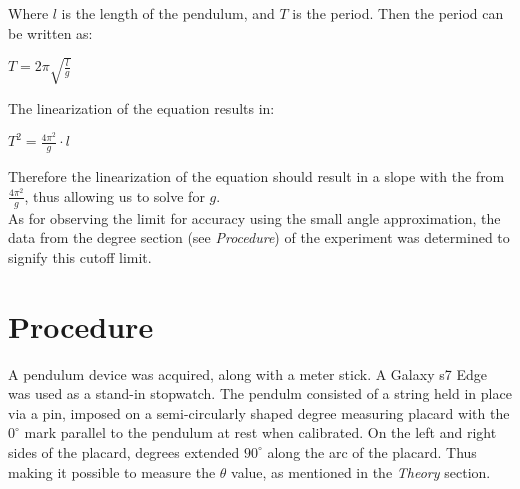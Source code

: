 \documentclass{article}
\begin{document}
Where $l$ is the length of the pendulum, and $T$ is the period.  Then the period can be written as:\\

\begin{center}
  {$T = 2 \pi \sqrt{\frac{l}{g}}$}\\
\end{center}

The linearization of the equation results in:\\

\begin{center}
  {$T^2 = \frac{4 \pi^2}{g} \cdot l$}
\end{center}

Therefore the linearization of the equation should result in a slope with the from $\frac{4 \pi^2}{g}$,
thus allowing us to solve for $g$.\\

As for observing the limit for accuracy using the small angle approximation,  the data from the degree
section (see \textit{Procedure}) of the experiment was determined to signify this cutoff limit.



\section{Procedure}

A pendulum device was acquired, along with a meter stick.  A Galaxy s7 Edge was used as
a stand-in stopwatch.  The pendulm consisted of a string held in place via a pin, imposed
on a semi-circularly shaped degree measuring placard with the $0^{\circ}$ mark parallel to
the pendulum at rest when calibrated. On the left and right sides of the placard, degrees extended $90^{\circ}$
along the arc of the placard.  Thus making it possible to measure the $\theta$ value, as mentioned
in the \textit{Theory} section.\\
\end{document}
